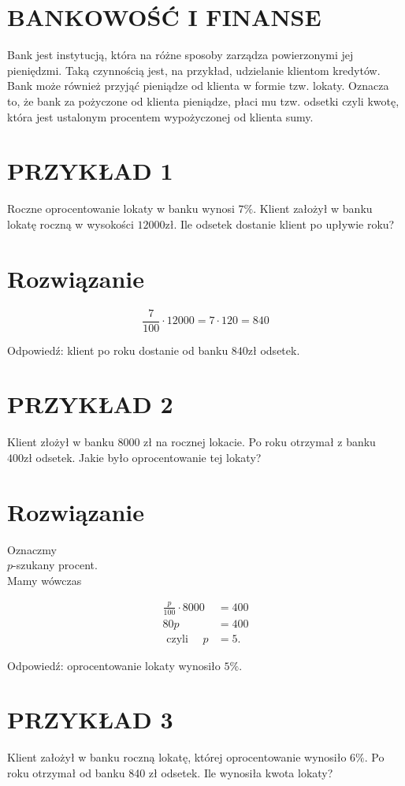 \documentclass[10pt]{article}
\begin{document}
\section*{BANKOWOŚĆ I FINANSE}
Bank jest instytucją, która na różne sposoby zarządza powierzonymi jej pieniędzmi. Taką czynnością jest, na przykład, udzielanie klientom kredytów. Bank może również przyjąć pieniądze od klienta w formie tzw. lokaty. Oznacza to, że bank za pożyczone od klienta pieniądze, płaci mu tzw. odsetki czyli kwotę, która jest ustalonym procentem wypożyczonej od klienta sumy.

\section*{PRZYKŁAD 1}
Roczne oprocentowanie lokaty w banku wynosi \(7 \%\). Klient założył w banku lokatę roczną w wysokości \(12000 \mathrm{zł}\). Ile odsetek dostanie klient po upływie roku?

\section*{Rozwiązanie}
\[
\frac{7}{100} \cdot 12000=7 \cdot 120=840
\]

Odpowiedź: klient po roku dostanie od banku \(840 \mathrm{zł}\) odsetek.

\section*{PRZYKŁAD 2}
Klient złożył w banku 8000 zł na rocznej lokacie. Po roku otrzymał z banku \(400 \mathrm{zł}\) odsetek. Jakie było oprocentowanie tej lokaty?

\section*{Rozwiązanie}
Oznaczmy\\
\(p\)-szukany procent.\\
Mamy wówczas

\[
\begin{aligned}
\frac{p}{100} \cdot 8000 & =400 \\
80 p & =400 \\
\text { czyli } \quad p & =5 .
\end{aligned}
\]

Odpowiedź: oprocentowanie lokaty wynosiło \(5 \%\).

\section*{PRZYKŁAD 3}
Klient założył w banku roczną lokatę, której oprocentowanie wynosiło \(6 \%\). Po roku otrzymał od banku 840 zł odsetek. Ile wynosiła kwota lokaty?
\end{document}
